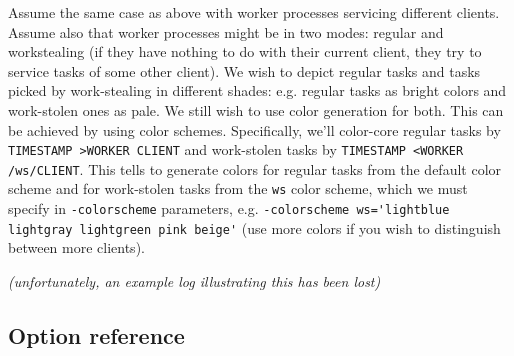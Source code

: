 \documentclass{article}
\begin{document}
Assume the same case as above with worker processes servicing different clients. Assume also that worker processes might be in two modes: regular and workstealing (if they have nothing to do with their current client, they try to service tasks of some other client). We wish to depict regular tasks and tasks picked by work-stealing in different shades: e.g. regular tasks as bright colors and work-stolen ones as pale. We still wish to use color generation for both. This can be achieved by using color schemes. Specifically, we'll color-core regular tasks by \verb|TIMESTAMP >WORKER CLIENT| and work-stolen tasks by \verb|TIMESTAMP <WORKER /ws/CLIENT|. This tells \splot{} to generate colors for regular tasks from the default color scheme and for work-stolen tasks from the \verb|ws| color scheme, which we must specify in \verb|-colorscheme| parameters, e.g. \verb|-colorscheme ws='lightblue lightgray lightgreen pink beige'| (use more colors if you wish to distinguish between more clients).

\emph{(unfortunately, an example log illustrating this has been lost)}

\subsection{Option reference}
\end{document}
